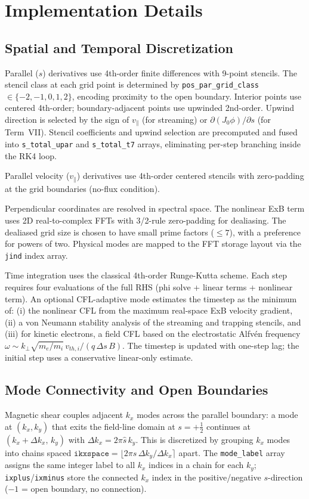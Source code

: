 \documentclass{article}
\theoremstyle{plain}
\theoremstyle{definition}
\theoremstyle{remark}
\begin{document}
\section{Implementation Details}

\subsection{Spatial and Temporal Discretization}
Parallel ($s$) derivatives use 4th-order finite differences with 9-point stencils. The stencil class at each grid point is determined by \texttt{pos\_par\_grid\_class} $\in \{-2,-1,0,1,2\}$, encoding proximity to the open boundary. Interior points use centered 4th-order; boundary-adjacent points use upwinded 2nd-order. Upwind direction is selected by the sign of $v_\parallel$ (for streaming) or $\partial(J_0\phi)/\partial s$ (for Term~VII). Stencil coefficients and upwind selection are precomputed and fused into \texttt{s\_total\_upar} and \texttt{s\_total\_t7} arrays, eliminating per-step branching inside the RK4 loop.

Parallel velocity ($v_\parallel$) derivatives use 4th-order centered stencils with zero-padding at the grid boundaries (no-flux condition).

Perpendicular coordinates are resolved in spectral space. The nonlinear ExB term uses 2D real-to-complex FFTs with 3/2-rule zero-padding for dealiasing. The dealiased grid size is chosen to have small prime factors ($\leq 7$), with a preference for powers of two. Physical modes are mapped to the FFT storage layout via the \texttt{jind} index array.

Time integration uses the classical 4th-order Runge-Kutta scheme. Each step requires four evaluations of the full RHS (phi solve + linear terms + nonlinear term). An optional CFL-adaptive mode estimates the timestep as the minimum of: (i) the nonlinear CFL from the maximum real-space ExB velocity gradient, (ii) a von Neumann stability analysis of the streaming and trapping stencils, and (iii) for kinetic electrons, a field CFL based on the electrostatic Alfv\'{e}n frequency $\omega \sim k_\perp \sqrt{m_e / m_i}\, v_{th,i} / (q\, \Delta s\, B)$. The timestep is updated with one-step lag; the initial step uses a conservative linear-only estimate.

\subsection{Mode Connectivity and Open Boundaries}
Magnetic shear couples adjacent $k_x$ modes across the parallel boundary: a mode at $(k_x, k_y)$ that exits the field-line domain at $s = +\tfrac{1}{2}$ continues at $(k_x + \Delta k_x,\, k_y)$ with $\Delta k_x = 2\pi\hat{s}\,k_y$. This is discretized by grouping $k_x$ modes into chains spaced $\texttt{ikxspace} = \lfloor 2\pi\hat{s}\,\Delta k_y / \Delta k_x \rceil$ apart.
The \texttt{mode\_label} array assigns the same integer label to all $k_x$ indices in a chain for each $k_y$; \texttt{ixplus}/\texttt{ixminus} store the connected $k_x$ index in the positive/negative $s$-direction ($-1$ = open boundary, no connection).
\end{document}
